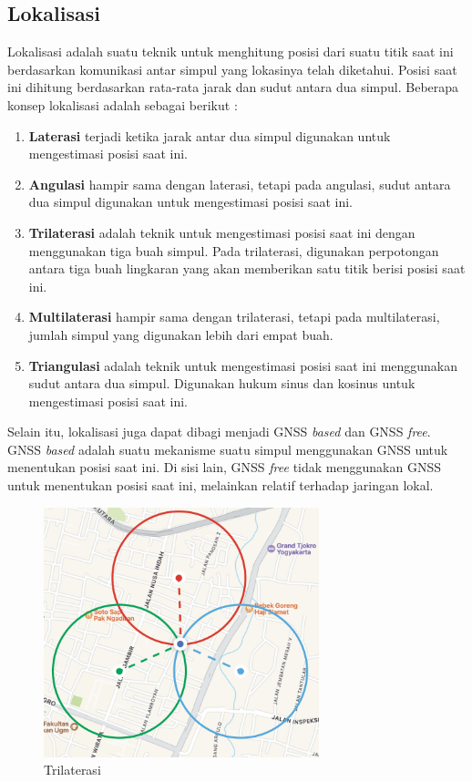 \subsection{Lokalisasi}
Lokalisasi adalah suatu teknik untuk menghitung posisi dari suatu titik saat ini berdasarkan komunikasi antar simpul yang lokasinya telah diketahui. Posisi saat ini dihitung berdasarkan rata-rata jarak dan sudut antara dua simpul. Beberapa konsep lokalisasi adalah sebagai berikut \cite{Alrajeh2013}:

\begin{enumerate}
	\item \textbf{Laterasi} terjadi ketika jarak antar dua simpul digunakan untuk mengestimasi posisi saat ini.
	\item \textbf{Angulasi} hampir sama dengan laterasi, tetapi pada angulasi, sudut antara dua simpul digunakan untuk mengestimasi posisi saat ini.
	\item \textbf{Trilaterasi} adalah teknik untuk mengestimasi posisi saat ini dengan menggunakan tiga buah simpul. Pada trilaterasi, digunakan perpotongan antara tiga buah lingkaran yang akan memberikan satu titik berisi posisi saat ini.
	\item \textbf{Multilaterasi} hampir sama dengan trilaterasi, tetapi pada multilaterasi, jumlah simpul yang digunakan lebih dari empat buah.
	\item \textbf{Triangulasi} adalah teknik untuk mengestimasi posisi saat ini menggunakan sudut antara dua simpul. Digunakan hukum sinus dan kosinus untuk mengestimasi posisi saat ini.
\end{enumerate}

Selain itu, lokalisasi juga dapat dibagi menjadi GNSS \textit{based} dan GNSS \textit{free}. GNSS \textit{based} adalah suatu mekanisme suatu simpul menggunakan GNSS untuk menentukan posisi saat ini. Di sisi lain, GNSS \textit{free} tidak menggunakan GNSS untuk menentukan posisi saat ini, melainkan relatif terhadap jaringan lokal.

\begin{figure}[H]
	\centering
	\includegraphics[width=8cm]{contents/chapter-2/trilaterasi.png}
	\caption{Trilaterasi}
	\label{Fig: Trilaterasi}
\end{figure}

